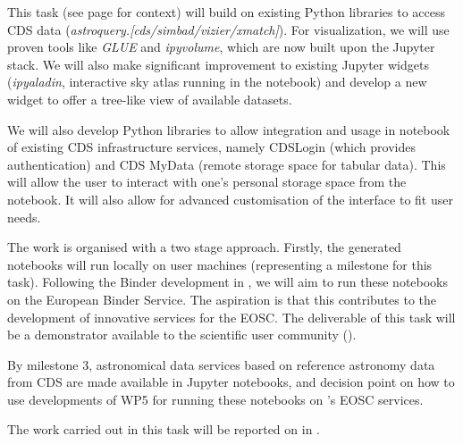 \begin{task}[
  title=Demonstrator: Astronomy,
  id=astro,
  lead=CDS,
  PM=18,
  wphases={18-42},
  partners={EGI,INSERM,QS,SRL,WTT,XFEL}
]

  This task (see page \pageref{sec:concept-demonstrator-astronomy} for
  context) will build on existing Python libraries to access CDS data
  (\textit{astroquery.[cds/simbad/vizier/xmatch]}). For visualization, we will
  use proven tools like \textit{GLUE} and \textit{ipyvolume}, which are now
  built upon the Jupyter stack.
  We will also make significant improvement to existing Jupyter widgets
  (\textit{ipyaladin}, interactive sky atlas running in the notebook) and
  develop a new widget to offer a tree-like view of available
  datasets.

  We will also develop Python libraries to allow integration and usage in
  notebook of existing CDS infrastructure services, namely CDSLogin (which
  provides authentication) and CDS MyData (remote storage space for tabular
  data).
  This will allow the user to interact with one's personal storage space from
  the notebook. It will also allow for advanced customisation of the interface
  to fit user needs.

  The work is organised with a two stage approach. Firstly, the generated
  notebooks will run locally on user machines (representing a milestone for
  this task). Following the Binder development in , we will aim
  to run these notebooks on the European Binder Service. The aspiration is
  that this contributes to the development of innovative services for the EOSC.
  The deliverable of this task will be a demonstrator available to the
  scientific user community ().

  By milestone 3, astronomical data services based on reference
  astronomy data from CDS are made available in Jupyter notebooks, and
  decision point on how to use developments of WP5 for running these
  notebooks on \TheProject's EOSC services.

  The work carried out in this task will be reported on in
  .
\end{task}
